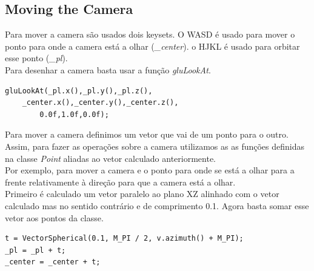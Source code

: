 \documentclass[a4paper]{report}
\begin{document}
\subsection{Moving the Camera}
Para mover a camera são usados dois keysets. O WASD é usado para mover o ponto
para onde a camera está a olhar (\textit{\_center}). o HJKL é usado para orbitar
esse ponto (\textit{\_pl}).\\
Para desenhar a camera basta usar a função \textit{gluLookAt}.
\begin{lstlisting}
gluLookAt(_pl.x(),_pl.y(),_pl.z(), 
	_center.x(),_center.y(),_center.z(),
		0.0f,1.0f,0.0f);
\end{lstlisting}
Para mover a camera definimos um vetor que vai de um ponto para o outro.\\
Assim, para fazer as operações sobre a camera utilizamos as as funções definidas
na classe \textit{Point} aliadas ao vetor calculado anteriormente.\\
Por exemplo, para mover a camera e o ponto para onde se está a olhar para a
frente relativamente à direção para que a camera está a olhar.\\
Primeiro é calculado um vetor paralelo ao plano XZ alinhado com o vetor
calculado mas no sentido contrário e de comprimento 0.1. Agora basta somar esse
vetor aos pontos da classe.\\
\begin{lstlisting}
t = VectorSpherical(0.1, M_PI / 2, v.azimuth() + M_PI);
_pl = _pl + t;
_center = _center + t;
\end{lstlisting}
\end{document}
